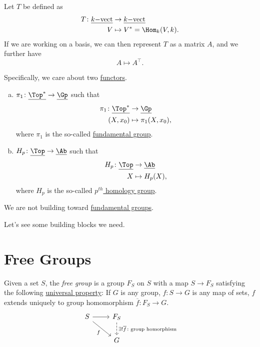 \begin{eg}
	Let \(T\) be defined as
	\[
		\begin{split}
			T\colon \underline{k\mathrm{-vect}} & \to \underline{k\mathrm{-vect}}   \\
			V                                   & \mapsto V^{\ast} = \Hom _k(V, k).
		\end{split}
	\]
	If we are working on a basis, we can then represent \(T\) as a matrix \(A\), and we further have
	\[
		A\mapsto A^{\top}.
	\]
\end{eg}

\begin{remark}
	Specifically, we care about two \hyperref[def:functor]{functors}.
	\begin{enumerate}[(a)]
		\item \(\pi _1\colon \underline{\Top^{\ast}} \to \underline{\Gp}\) such that
		      \[
			      \begin{split}
				      \pi _1\colon \underline{\Top^{\ast}} & \to \underline{\Gp}    \\
				      (X, x_0)                             & \mapsto \pi_1(X, x_0),
			      \end{split}
		      \]
		      where \(\pi _1\) is the so-called \hyperref[def:fundamental-group]{fundamental group}.
		\item \(H_p\colon \underline{\Top} \to \underline{\Ab}\) such that
		      \[
			      \begin{split}
				      H_p\colon \underline{\Top} & \to \underline{\Ab} \\
				      X                          & \mapsto H_{p} (X),
			      \end{split}
		      \]
		      where \(H_{p}\) is the so-called \hyperref[def:homology-group]{\(p^{th}\) homology group}.
	\end{enumerate}
	We are not building toward \hyperref[def:fundamental-group]{fundamental groups}.
\end{remark}

Let's see some building blocks we need.

\section{Free Groups}
\begin{definition}\label{def:free-group}
	Given a set \(S\), the \emph{free group} is a group \(F_S\) on \(S\) with a map \(S\to F_S\) satisfying the following \underline{universal property}: If \(G\) is any group, \(f\colon S\to G\) is any map of sets, \(f\) extends uniquely to group homomorphism \(\overline{f} \colon F_S \to G\).
	\[
		\begin{tikzcd}
			S \ar[rd, "f"']\ar[r, ] & F_S\ar[d, dashed, "\exists ! \overline{f} \colon \text{group homorphism} "]\\
			& G
		\end{tikzcd}
	\]
\end{definition}

